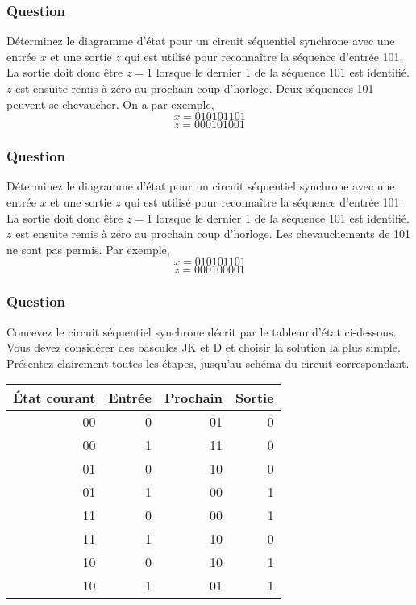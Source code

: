 \documentclass[11pt]{article}
\begin{document}
\subsubsection*{Question}
\label{sec:org140212d}
Déterminez le diagramme d'état pour un circuit séquentiel synchrone
  avec une entrée \(x\) et une sortie \(z\) qui est utilisé pour
  reconnaître la séquence d'entrée 101. La sortie doit donc être \(z=1\)
  lorsque le dernier 1 de la séquence 101 est identifié. \(z\) est
  ensuite remis à zéro au prochain coup d'horloge. Deux séquences 101
  peuvent se chevaucher. On a par exemple,
  $$
    x  =  010101101
    $$
  $$ z = 000101001
    $$

\subsubsection*{Question}
\label{sec:orgfc0976e}
Déterminez le diagramme d'état pour un circuit séquentiel synchrone
  avec une entrée \(x\) et une sortie \(z\) qui est utilisé pour
  reconnaître la séquence d'entrée 101. La sortie doit donc être \(z=1\)
  lorsque le dernier 1 de la séquence 101 est identifié. \(z\) est
  ensuite remis à zéro au prochain coup d'horloge. Les chevauchements de 101 ne sont pas 
  permis. Par exemple,
  $$
    x = 010101101
    $$
  $$
    z = 000100001
    $$

\subsubsection*{Question}
\label{sec:org8a41799}
Concevez le circuit séquentiel synchrone décrit par le tableau
  d'état ci-dessous. Vous devez considérer des bascules JK et D et
  choisir la solution la plus simple. Présentez clairement toutes les
  étapes, jusqu'au schéma du circuit correspondant.
\begin{center}
\begin{tabular}{rrrr}
État courant & Entrée & Prochain & Sortie\\[0pt]
\hline
00 & 0 & 01 & 0\\[0pt]
00 & 1 & 11 & 0\\[0pt]
01 & 0 & 10 & 0\\[0pt]
01 & 1 & 00 & 1\\[0pt]
11 & 0 & 00 & 1\\[0pt]
11 & 1 & 10 & 0\\[0pt]
10 & 0 & 10 & 1\\[0pt]
10 & 1 & 01 & 1\\[0pt]
\end{tabular}
\end{center}
\end{document}
